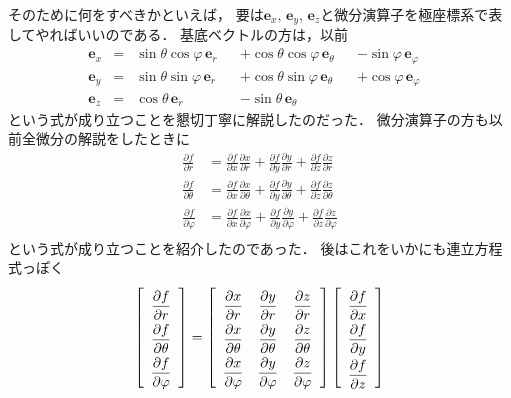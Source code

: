 そのために何をすべきかといえば，
要は$\bm{e}_x, \, \bm{e}_y, \, \bm{e}_z$と微分演算子を極座標系で表してやればいいのである．
基底ベクトルの方は，以前
\begin{align*}
\bm{e}_x & = & \sin \theta \cos \varphi \, \bm{e} _r & & 
+ \cos \theta \cos \varphi \, \bm{e}_\theta & & - \sin \varphi \, \bm{e}_\varphi & \\
\bm{e}_y & = & \sin \theta \sin \varphi \, \bm{e}_r & & 
+ \cos \theta \sin \varphi \, \bm{e}_\theta & & 
+ \cos \varphi \, \bm{e}_\varphi & \\
\bm{e}_z & = & \cos \theta \, \bm{e}_r & & - \sin \theta \, \bm{e}_\theta &
\end{align*}
という式が成り立つことを懇切丁寧に解説したのだった．
微分演算子の方も以前全微分の解説をしたときに
\begin{align*}
\frac{ \partial f} {\partial r} & 
= \frac{ \partial f} {\partial x} \frac{ \partial x} {\partial r}
+ \frac{ \partial f} {\partial y} \frac{ \partial y} {\partial r}
+ \frac{ \partial f} {\partial z} \frac{ \partial z} {\partial r} \\
\frac{ \partial f} {\partial \theta} & 
= \frac{ \partial f} {\partial x} \frac{ \partial x} {\partial \theta}
+ \frac{ \partial f} {\partial y} \frac{ \partial y} {\partial \theta}
+ \frac{ \partial f} {\partial z} \frac{ \partial z} {\partial \theta} \\
\frac{ \partial f} {\partial \varphi} & 
= \frac{ \partial f} {\partial x} \frac{ \partial x} {\partial \varphi}
+ \frac{ \partial f} {\partial y} \frac{ \partial y} {\partial \varphi}
+ \frac{ \partial f} {\partial z} \frac{ \partial z} {\partial \varphi} \\
\end{align*}
という式が成り立つことを紹介したのであった．
後はこれをいかにも連立方程式っぽく
\begin{align*}
\left[ 
\renewcommand{\arraystretch}{2}
\begin{array}{c}
\dfrac{ \partial f} {\partial r} \\
\dfrac{ \partial f} {\partial \theta} \\
\dfrac{ \partial f} {\partial \varphi}
\end{array}
\right] = \left[
\begin{array}{ccc}
\dfrac{ \partial x} {\partial r} & \dfrac{ \partial y} {\partial r} 
& \dfrac{ \partial z} {\partial r} \\
\dfrac{ \partial x} {\partial \theta} & \dfrac{ \partial y} {\partial \theta} 
& \dfrac{ \partial z} {\partial \theta} \\ 
\dfrac{ \partial x} {\partial \varphi} & \dfrac{ \partial y} {\partial \varphi}
& \dfrac{ \partial z} {\partial \varphi}
\end{array}
\right]
\left[
\begin{array}{c}
\dfrac{ \partial f} {\partial x} \\
\dfrac{ \partial f} {\partial y} \\
\dfrac{ \partial f} {\partial z}
\end{array}
\right]
\end{align*}
